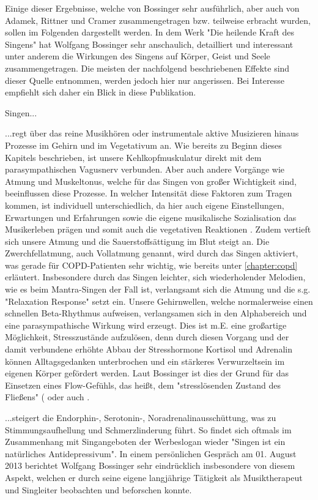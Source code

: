 Einige dieser Ergebnisse, welche von Bossinger sehr ausführlich, aber auch von Adamek, Rittner und Cramer zusammengetragen bzw. teilweise erbracht wurden, sollen im Folgenden dargestellt werden.
In dem Werk "Die heilende Kraft des Singens" hat Wolfgang Bossinger sehr anschaulich, detailliert und interessant unter anderem die Wirkungen des Singens auf Körper, Geist und Seele zusammengetragen. Die meisten der nachfolgend beschriebenen Effekte sind dieser Quelle entnommen, werden jedoch hier nur angerissen. Bei Interesse empfiehlt sich daher ein Blick in diese Publikation.

Singen...

...regt über das reine Musikhören oder instrumentale aktive Musizieren hinaus Prozesse im Gehirn und im Vegetativum an. Wie bereits zu Beginn dieses Kapitels beschrieben, ist unsere Kehlkopfmuskulatur direkt mit dem parasympathischen Vagusnerv verbunden. Aber auch andere Vorgänge wie Atmung und Muskeltonus, welche für das Singen von großer Wichtigkeit sind, beeinflussen diese Prozesse. In welcher Intensität diese Faktoren zum Tragen kommen, ist individuell unterschiedlich, da hier auch eigene Einstellungen, Erwartungen und Erfahrungen sowie die eigene musikalische Sozialisation das Musikerleben prägen und somit auch die vegetativen Reaktionen \autocite[vgl.][121]{bossinger2006}. Zudem vertieft sich unsere Atmung und die Sauerstoffsättigung im Blut steigt an. Die Zwerchfellatmung, auch Vollatmung genannt, wird durch das Singen aktiviert, was gerade für COPD-Patienten sehr wichtig, wie bereits unter \ref{chapter:copd} erläutert. Insbesondere durch das Singen leichter, sich wiederholender Melodien, wie es beim Mantra-Singen der Fall ist, verlangsamt sich die Atmung und die s.g. "Relaxation Response" setzt ein. Unsere Gehirnwellen, welche normalerweise einen schnellen Beta-Rhythmus aufweisen, verlangsamen sich in den Alphabereich und eine parasympathische Wirkung wird erzeugt. Dies ist m.E. eine großartige Möglichkeit, Stresszustände aufzulösen, denn durch diesen Vorgang und der damit verbundene erhöhte Abbau der Stresshormone Kortisol und Adrenalin können Alltagsgedanken unterbrochen und ein stärkeres Verwurzeltsein im eigenen Körper gefördert werden. Laut Bossinger ist dies der Grund für das Einsetzen eines Flow-Gefühls, das heißt, dem "stresslösenden Zustand des Fließens" (\cite[vgl.]{bossinger2014} oder auch \cite[vgl.][202ff.]{bossinger2006}.

...steigert die Endorphin-, Serotonin-, Noradrenalinausschüttung, was zu Stimmungsaufhellung und Schmerzlinderung führt. So findet sich oftmals im Zusammenhang mit Singangeboten der Werbeslogan wieder "Singen ist ein natürliches Antidepressivum". In einem persönlichen Gespräch am 01. August 2013 berichtet Wolfgang Bossinger sehr eindrücklich insbesondere von diesem Aspekt, welchen er durch seine eigene langjährige Tätigkeit als Musiktherapeut und Singleiter beobachten und beforschen konnte.

